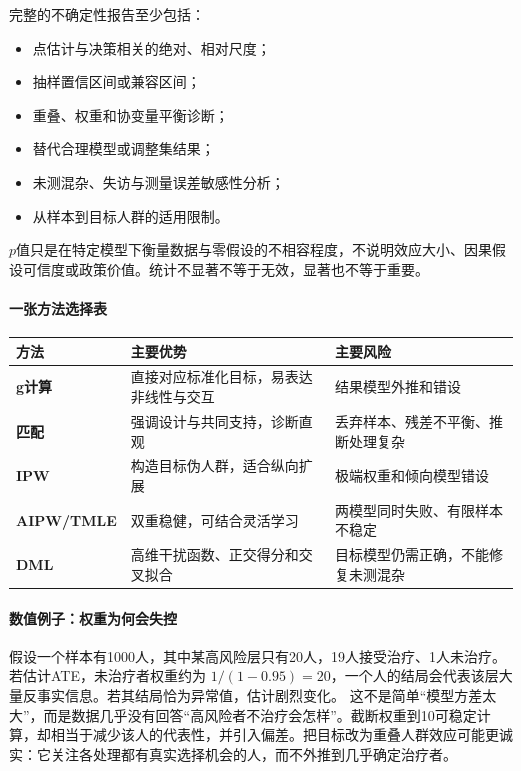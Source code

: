 完整的不确定性报告至少包括：

\begin{itemize}
  \item 点估计与决策相关的绝对、相对尺度；
  \item 抽样置信区间或兼容区间；
  \item 重叠、权重和协变量平衡诊断；
  \item 替代合理模型或调整集结果；
  \item 未测混杂、失访与测量误差敏感性分析；
  \item 从样本到目标人群的适用限制。
\end{itemize}

$p$值只是在特定模型下衡量数据与零假设的不相容程度，不说明效应大小、因果假设可信度或政策价值。统计不显著不等于无效，显著也不等于重要。

\paragraph{一张方法选择表}

\begin{center}
\small
\begin{tabularx}{\textwidth}{>{\bfseries}p{2.2cm}X X}
\toprule
方法 & 主要优势 & 主要风险\\
\midrule
g计算 & 直接对应标准化目标，易表达非线性与交互 & 结果模型外推和错设\\
匹配 & 强调设计与共同支持，诊断直观 & 丢弃样本、残差不平衡、推断处理复杂\\
IPW & 构造目标伪人群，适合纵向扩展 & 极端权重和倾向模型错设\\
AIPW/TMLE & 双重稳健，可结合灵活学习 & 两模型同时失败、有限样本不稳定\\
DML & 高维干扰函数、正交得分和交叉拟合 & 目标模型仍需正确，不能修复未测混杂\\
\bottomrule
\end{tabularx}
\end{center}

\paragraph{数值例子：权重为何会失控}

假设一个样本有1000人，其中某高风险层只有20人，19人接受治疗、1人未治疗。若估计ATE，未治疗者权重约为 $1/(1-0.95)=20$，一个人的结局会代表该层大量反事实信息。若其结局恰为异常值，估计剧烈变化。
这不是简单“模型方差太大”，而是数据几乎没有回答“高风险者不治疗会怎样”。截断权重到10可稳定计算，却相当于减少该人的代表性，并引入偏差。把目标改为重叠人群效应可能更诚实：它关注各处理都有真实选择机会的人，而不外推到几乎确定治疗者。

